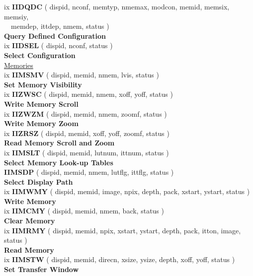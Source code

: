 \begin{tabbing}
ix \> {\bf IIDQDC} \> ( dispid, nconf, memtyp, nmemax, modcon, memid, memsix,
                        memsiy,\\
                \> \> ~~memdep, ittdep, nmem, status )\\
                \> \> {\bf Query Defined Configuration}\\ [1.5ex]
ix \> {\bf IIDSEL} \> ( dispid, nconf, status )\\
                \> \> {\bf Select Configuration}\\ [1.5ex]
\> \underline{Memories}\\ [1.5ex]
ix \> {\bf IIMSMV} \> ( dispid, memid, nmem, lvis, status )\\
                \> \> {\bf Set Memory Visibility}\\ [1.5ex]
ix \> {\bf IIZWSC} \> ( dispid, memid, nmem, xoff, yoff, status )\\
                \> \> {\bf Write Memory Scroll}\\ [1.5ex]
ix \> {\bf IIZWZM} \> ( dispid, memid, nmem, zoomf, status )\\
                \> \> {\bf Write Memory Zoom}\\ [1.5ex]
ix \> {\bf IIZRSZ} \> ( dispid, memid, xoff, yoff, zoomf, status )\\
                \> \> {\bf Read Memory Scroll and Zoom}\\ [1.5ex]
ix \> {\bf IIMSLT} \> ( dispid, memid, lutnum, ittnum, status )\\
                \> \> {\bf Select Memory Look-up Tables}\\ [1.5ex]
   \> {\bf IIMSDP} \> ( dispid, memid, nmem, lutflg, ittflg, status )\\
                \> \> {\bf Select Display Path}\\ [1.5ex]
ix \> {\bf IIMWMY} \> ( dispid, memid, image, npix, depth, pack, xstart, ystart,
                        status )\\
                \> \> {\bf Write Memory}\\ [1.5ex]
ix \> {\bf IIMCMY} \> ( dispid, memid, nmem, back, status )\\
                \> \> {\bf Clear Memory}\\ [1.5ex]
ix \> {\bf IIMRMY} \> ( dispid, memid, npix, xstart, ystart, depth, pack, itton,
                        image, status )\\
                \> \> {\bf Read Memory}\\ [1.5ex]
ix \> {\bf IIMSTW} \> ( dispid, memid, direcn, xsize, ysize, depth, xoff, yoff,
                        status )\\
                \> \> {\bf Set Transfer Window}\\ [1.5ex]
\end{tabbing}
